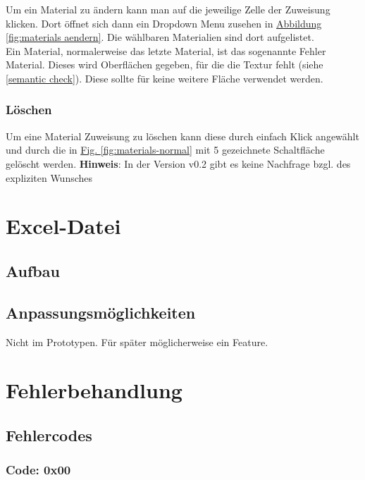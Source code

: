 \documentclass{book}
\newcommand{\hinweis}[1]{\newline \textbf{Hinweis}: #1 \newline}
\begin{document}
					Um ein Material zu ändern kann man auf die jeweilige Zelle der Zuweisung klicken. Dort öffnet sich dann ein Dropdown Menu zusehen in \hyperref[fig:materials aendern]{Abbildung \ref{fig:materials aendern}}. Die wählbaren Materialien sind dort aufgelistet. \\
					Ein Material, normalerweise das letzte Material, ist das sogenannte Fehler Material. Dieses wird Oberflächen gegeben, für die die Textur fehlt (siehe \hyperref[semantic check]{\ref{semantic check}}). Diese sollte für keine weitere Fläche verwendet werden.
			\subsection{Löschen} \label{material-loeschen}
				Um eine Material Zuweisung zu löschen kann diese durch einfach Klick angewählt und durch die in \hyperref[fig:materials-normal]{Fig. \ref{fig:materials-normal}} mit 5 gezeichnete Schaltfläche gelöscht werden.
				\hinweis{In der Version v0.2 gibt es keine Nachfrage bzgl. des expliziten Wunsches}			
	\chapter{Excel-Datei}\label{excel}
		\section{Aufbau}
		\section{Anpassungsmöglichkeiten}
			Nicht im Prototypen. Für später möglicherweise ein Feature.
	\chapter{Fehlerbehandlung}
		\section{Fehlercodes}
			\subsection*{Code: 0x00}
\end{document}
